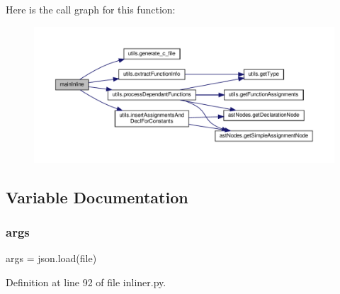 Here is the call graph for this function\+:\nopagebreak
\begin{figure}[H]
\begin{center}
\leavevmode
\includegraphics[width=350pt]{namespaceinliner_a85ff5417ce309a641abfa41d26e8d7f3_cgraph}
\end{center}
\end{figure}


\subsection{Variable Documentation}
\mbox{\label{namespaceinliner_a8187411843a6284ffb964ef3fb9fcab3}} 
\subsubsection{\texorpdfstring{args}{args}}
{\footnotesize\ttfamily args = json.\+load(file)}



Definition at line 92 of file inliner.\+py.

